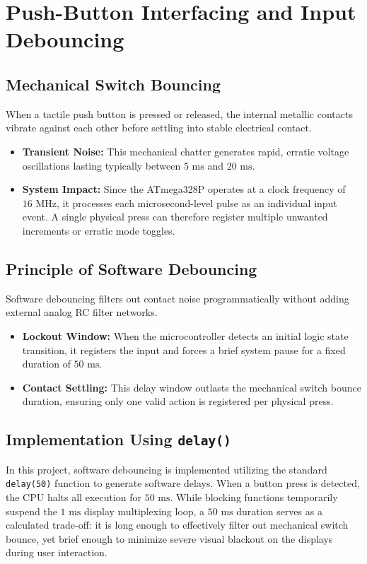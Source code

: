 \documentclass[journal,12pt,onecolumn]{IEEEtran}
\begin{document}
		\section{Push-Button Interfacing and Input Debouncing}
		
		\subsection{Mechanical Switch Bouncing}
		When a tactile push button is pressed or released, the internal metallic contacts vibrate against each other before settling into stable electrical contact.
		\begin{itemize}
			\item \textbf{Transient Noise:} This mechanical chatter generates rapid, erratic voltage oscillations lasting typically between $5\text{ ms}$ and $20\text{ ms}$.
			\item \textbf{System Impact:} Since the ATmega328P operates at a clock frequency of $16\text{ MHz}$, it processes each microsecond-level pulse as an individual input event. A single physical press can therefore register multiple unwanted increments or erratic mode toggles.
		\end{itemize}
		
		\subsection{Principle of Software Debouncing}
		Software debouncing filters out contact noise programmatically without adding external analog RC filter networks.
		\begin{itemize}
			\item \textbf{Lockout Window:} When the microcontroller detects an initial logic state transition, it registers the input and forces a brief system pause for a fixed duration of $50\text{ ms}$.
			\item \textbf{Contact Settling:} This delay window outlasts the mechanical switch bounce duration, ensuring only one valid action is registered per physical press.
		\end{itemize}
		
		\subsection{Implementation Using \texttt{delay()}}
		In this project, software debouncing is implemented utilizing the standard \texttt{delay(50)} function to generate software delays. When a button press is detected, the CPU halts all execution for $50\text{ ms}$. While blocking functions temporarily suspend the $1\text{ ms}$ display multiplexing loop, a $50\text{ ms}$ duration serves as a calculated trade-off: it is long enough to effectively filter out mechanical switch bounce, yet brief enough to minimize severe visual blackout on the displays during user interaction.
		
\end{document}
